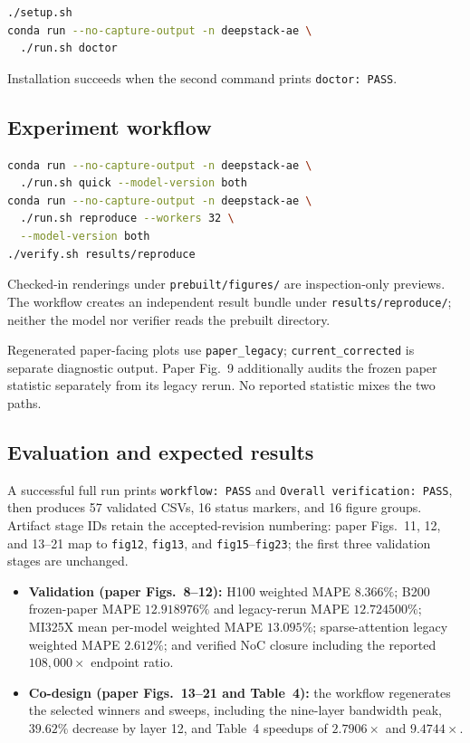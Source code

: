 \documentclass[10pt,twocolumn]{article}
\newcommand{\code}[1]{\texttt{#1}}
\begin{document}
\begin{lstlisting}[language=bash]
./setup.sh
conda run --no-capture-output -n deepstack-ae \
  ./run.sh doctor
\end{lstlisting}

Installation succeeds when the second command prints \code{doctor: PASS}.

\subsection{Experiment workflow}

\begin{lstlisting}[language=bash]
conda run --no-capture-output -n deepstack-ae \
  ./run.sh quick --model-version both
conda run --no-capture-output -n deepstack-ae \
  ./run.sh reproduce --workers 32 \
  --model-version both
./verify.sh results/reproduce
\end{lstlisting}

Checked-in renderings under \code{prebuilt/figures/} are inspection-only
previews. The workflow creates an independent result bundle under
\code{results/reproduce/}; neither the model nor verifier reads the prebuilt
directory.

Regenerated paper-facing plots use \code{paper\_legacy};
\code{current\_corrected} is separate diagnostic output. Paper Fig.~9
additionally audits the frozen paper statistic separately from its legacy
rerun. No reported statistic mixes the two paths.

\subsection{Evaluation and expected results}

A successful full run prints \code{workflow: PASS} and
\code{Overall verification: PASS}, then produces 57 validated CSVs, 16 status
markers, and 16 figure groups. Artifact stage IDs retain the accepted-revision
numbering: paper Figs.~11, 12, and 13--21 map to \code{fig12}, \code{fig13},
and \code{fig15}--\code{fig23}; the first three validation stages are
unchanged.

\begin{itemize}
  \item {\bf Validation (paper Figs.~8--12):} H100 weighted MAPE
        $8.366\%$; B200 frozen-paper MAPE $12.918976\%$ and legacy-rerun MAPE
        $12.724500\%$; MI325X mean per-model weighted MAPE $13.095\%$;
        sparse-attention legacy weighted MAPE $2.612\%$; and verified NoC
        closure including the reported $108{,}000\times$ endpoint ratio.
  \item {\bf Co-design (paper Figs.~13--21 and Table~4):} the workflow
        regenerates the selected winners and sweeps, including the nine-layer
        bandwidth peak, $39.62\%$ decrease by layer 12, and Table~4 speedups
        of $2.7906\times$ and $9.4744\times$.
\end{itemize}
\end{document}
